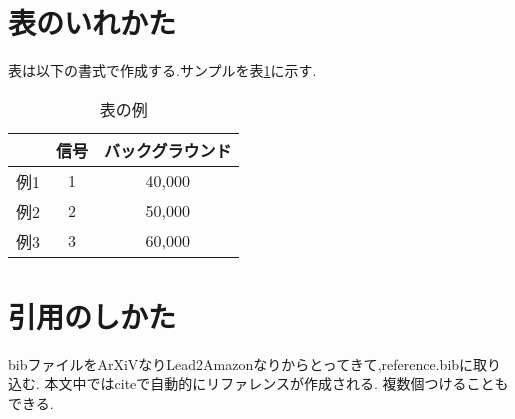 \section{表のいれかた}\label{sec:table}

表は以下の書式で作成する.サンプルを表\ref{tab:test5}に示す.
\begin{table}[tb]
	\centering
	\caption{表の例}
		\label{tab:test5}	
	  \begin{tabular}{lcc} 
		\hline
		 		&信号& バックグラウンド \\ 
		\hline \hline
		例1 	& 1	 & 40,000			\\
		例2 	& 2  & 50,000			\\
		例3 	& 3  & 60,000			\\
		\hline
	  \end{tabular}
\end{table}

\section{引用のしかた}\label{sec:ref}
bibファイルをArXiVなりLead2Amazonなりからとってきて,reference.bibに取り込む.
本文中ではciteで自動的にリファレンスが作成される\cite{myThesisTest1}.
複数個つけることもできる\cite{myThesisTest2,myWebsite}.

